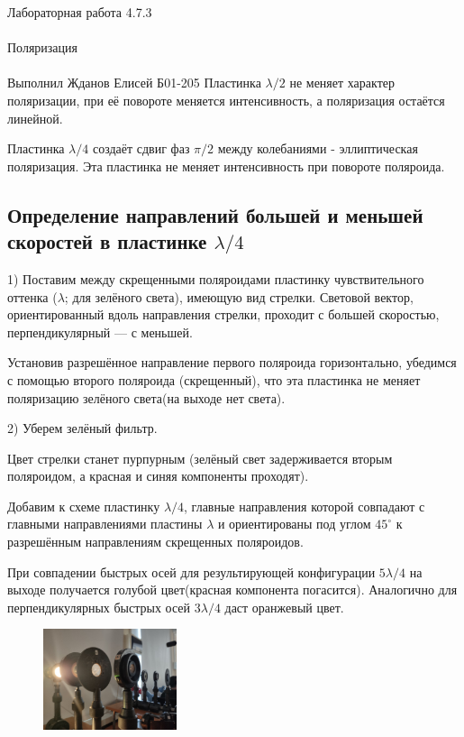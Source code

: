 \documentclass{astroedu-lab}
\begin{document}
\begin{problem}{\huge Лабораторная работа 4.7.3\\\\Поляризация\\\\Выполнил Жданов Елисей Б01-205}
Пластинка $\lambda/2$ не меняет характер поляризации, при её повороте меняется интенсивность, а поляризация остаётся линейной. 

Пластинка $\lambda/4$ создаёт сдвиг фаз $\pi/2$ между колебаниями - эллиптическая поляризация. Эта пластинка не меняет интенсивность при повороте поляроида.

\subsection{Определение направлений большей и меньшей скоростей в пластинке $\lambda/4$}

1) Поставим между скрещенными поляроидами пластинку чувствительного оттенка ($\lambda$; для зелёного света), имеющую вид стрелки. Световой вектор, ориентированный вдоль направления стрелки, проходит с большей скоростью, перпендикулярный — с меньшей.

Установив разрешённое направление первого поляроида горизонтально, убедимся с помощью второго поляроида (скрещенный), что эта пластинка не меняет поляризацию зелёного света(на выходе нет света).

2) Уберем зелёный фильтр.

Цвет стрелки станет пурпурным (зелёный свет задерживается вторым поляроидом, а красная и синяя компоненты проходят).

Добавим к схеме пластинку $\lambda/4$, главные направления которой совпадают с главными направлениями пластины $\lambda$ и ориентированы под углом $45^{\circ}$ к разрешённым направлениям скрещенных поляроидов.

При совпадении быстрых осей для результирующей конфигурации $5\lambda/4$ на выходе получается голубой цвет(красная компонента погасится). Аналогично для перпендикулярных быстрых осей $3\lambda/4$ даст оранжевый цвет.

\newpage

\begin{figure}[!h]
	\centering
	\includegraphics[width=0.35\textwidth]{photo/photo_2024-04-26_17-42-10.jpg}
	\label{fig:boiler}
\end{figure}


\end{problem}
\end{document}
